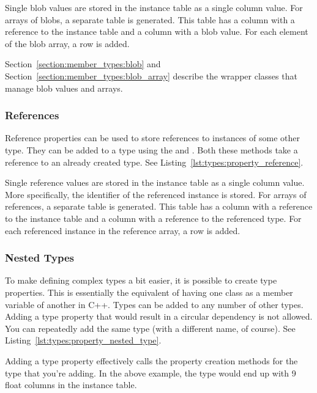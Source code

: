 Single blob values are stored in the instance table as a single column value. For arrays of blobs, a separate table is generated. This table has a column with a reference to the instance table and a column with a blob value. For each element of the blob array, a row is added.

Section~\ref{section:member_types:blob} and Section~\ref{section:member_types:blob_array} describe the wrapper classes that manage blob values and arrays.

\subsubsection{References}
\label{section:types:property_types:references}


Reference properties can be used to store references to instances of some other type. They can be added to a type using the  and . Both these methods take a reference to an already created type. See Listing~\ref{lst:types:property_reference}.



Single reference values are stored in the instance table as a single column value. More specifically, the identifier of the referenced instance is stored. For arrays of references, a separate table is generated. This table has a column with a reference to the instance table and a column with a reference to the referenced type. For each referenced instance in the reference array, a row is added.

\subsubsection{Nested Types}
\label{section:types:property_types:types}

To make defining complex types a bit easier, it is possible to create type properties. This is essentially the equivalent of having one class as a member variable of another in C++. Types can be added to any number of other types. Adding a type property that would result in a circular dependency is not allowed. You can repeatedly add the same type (with a different name, of course). See Listing~\ref{lst:types:property_nested_type}.



Adding a type property effectively calls the property creation methods for the type that you're adding. In the above example, the  type would end up with 9 float columns in the instance table.